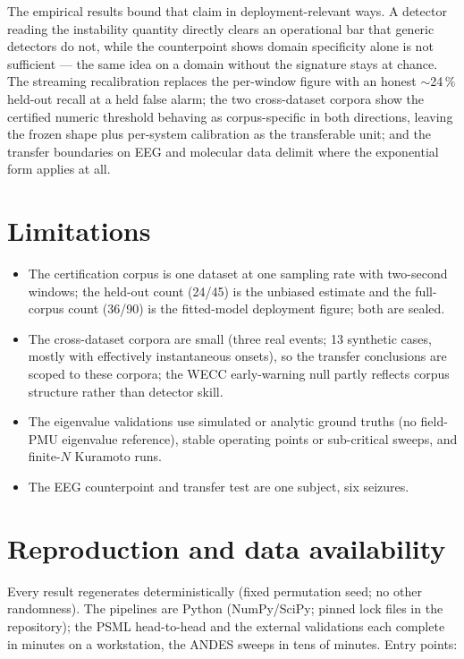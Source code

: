 \documentclass[journal]{IEEEtran}
\begin{document}
The empirical results bound that claim in deployment-relevant ways. A
detector reading the instability quantity directly clears an
operational bar that generic detectors do not, while the counterpoint
shows domain specificity alone is not sufficient --- the same idea on a
domain without the signature stays at chance. The streaming
recalibration replaces the per-window figure with an honest
$\sim$24\,\% held-out recall at a held false alarm; the two
cross-dataset corpora show the certified numeric threshold behaving as
corpus-specific in both directions, leaving the frozen shape plus
per-system calibration as the transferable unit; and the transfer
boundaries on EEG and molecular data delimit where the exponential
form applies at all.

\section{Limitations}\label{sec:limitations}

\begin{itemize}
  \item The certification corpus is one dataset at one sampling rate
    with two-second windows; the held-out count (24/45) is the unbiased
    estimate and the full-corpus count (36/90) is the fitted-model
    deployment figure; both are sealed.
  \item The cross-dataset corpora are small (three real events; 13
    synthetic cases, mostly with effectively instantaneous onsets), so
    the transfer conclusions are scoped to these corpora; the WECC
    early-warning null partly reflects corpus structure rather than
    detector skill.
  \item The eigenvalue validations use simulated or analytic ground
    truths (no field-PMU eigenvalue reference), stable operating points
    or sub-critical sweeps, and finite-$N$ Kuramoto runs.
  \item The EEG counterpoint and transfer test are one subject, six
    seizures.
\end{itemize}

\section{Reproduction and data availability}\label{sec:reproduction}

Every result regenerates deterministically (fixed permutation seed; no
other randomness). The pipelines are Python (NumPy/SciPy; pinned lock
files in the repository); the PSML head-to-head and the external
validations each complete in minutes on a workstation, the ANDES sweeps
in tens of minutes. Entry points:
\end{document}
